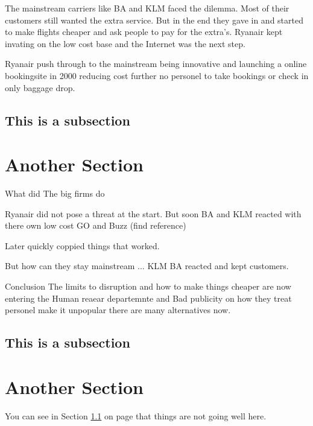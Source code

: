 \documentclass[a4paper, 11pt]{article}
\begin{document}
The mainstream carriers like BA and KLM faced the dilemma. Most of their customers still wanted the extra service. But in the end they gave in and started to make flights cheaper and ask people to pay for the extra's. Ryanair kept invating on the low cost base and the Internet was the next step.

Ryanair push through to the mainstream being innovative and launching a online bookingsite in 2000 reducing cost further no personel to take bookings or check in only baggage drop. 

\subsection{This is a subsection}
\label{sec:this-is-a-section}

\section{Another Section}


What did The big firms do 


Ryanair did not pose a threat at the start. But soon BA and KLM reacted with there own low cost GO and Buzz (find reference) 

Later quickly coppied things that worked.

But how can they stay mainstream ... KLM BA reacted and kept customers. 


Conclusion
The limits to disruption and how to make things cheaper are now entering the Human reaear departemnte and Bad publicity on how they treat personel make it unpopular there are many alternatives now.







\subsection{This is a subsection}
\label{sec:this-is-a-section}

\section{Another Section}


You can see in Section \ref{sec:this-is-a-section} on page \pageref{sec:this-is-a-section} that things are not going well here.

{}
\end{document}
